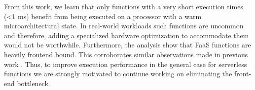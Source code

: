 \documentclass[../main.tex]{subfiles}
\begin{document}
\begin{refsection}[main-bib]

From this work, we learn that only functions with a very short
execution times (<1 ms) benefit from being executed on a processor
with a warm microarchitectural state. In real-world workloads such
functions are uncommon~\cite{shahrad20_server_wild,mahgoub22_wisef}
and therefore, adding a specialized hardware optimization to
accommodate them would not be worthwhile. Furthermore, the analysis
show that FaaS functions are heavily frontend bound. This corroborates
similar observations made in previous work
\cite{lukewarm_serverless,gan19_open_sourc_bench_suite_micros}. Thus,
to improve execution performance in the general case for
serverless functions we are strongly motivated to continue working on
eliminating the front-end bottleneck.


\end{refsection}
\end{document}
